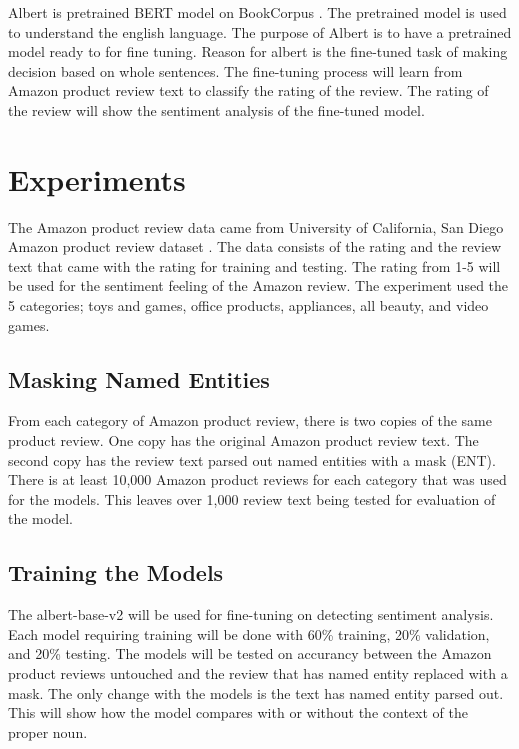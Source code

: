 \documentclass[11pt,a4paper]{article}
\begin{document}
Albert is pretrained BERT model on BookCorpus \cite{DBLP:journals/corr/abs-1909-11942}. The pretrained model is used to understand the english language. The purpose of Albert is to have a pretrained model ready to for fine tuning. Reason for albert is the fine-tuned task of making decision based on whole sentences. The fine-tuning process will learn from Amazon product review text to classify the rating of the review. The rating of the review will show the sentiment analysis of the fine-tuned model.

\section{Experiments}

The Amazon product review data came from University of California, San Diego Amazon product review dataset \cite{data}. The data consists of the rating and the review text that came with the rating for training and testing. The rating from 1-5 will be used for the sentiment feeling of the Amazon review. The experiment used the 5 categories; toys and games, office products, appliances, all beauty, and video games.

\subsection{Masking Named Entities}

From each category of Amazon product review, there is two copies of the same product review. One copy has the original Amazon product review text. The second copy has the review text parsed out named entities with a mask (ENT). There is at least 10,000 Amazon product reviews for each category that was used for the models. This leaves over 1,000 review text being tested for evaluation of the model.

\subsection{Training the Models}

The albert-base-v2 will be used for fine-tuning on detecting sentiment analysis. Each model requiring training will be done with 60\% training, 20\% validation, and 20\% testing. The models will be tested on accurancy between the Amazon product reviews untouched and the review that has named entity replaced with a mask. The only change with the models is the text has named entity parsed out. This will show how the model compares with or without the context of the proper noun.
\end{document}
